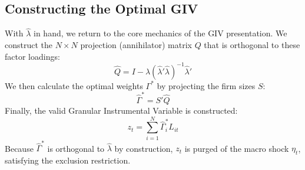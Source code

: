 \documentclass[11pt]{article}
\begin{document}
\subsection{Constructing the Optimal GIV}
With $\hat{\lambda}$ in hand, we return to the core mechanics of the GIV presentation. We construct the $N \times N$ projection (annihilator) matrix $Q$ that is orthogonal to these factor loadings:
\begin{equation}
    \hat{Q} = I - \hat{\lambda}(\hat{\lambda}'\hat{\lambda})^{-1}\hat{\lambda}'
\end{equation}
We then calculate the optimal weights $\Gamma^*$ by projecting the firm sizes $S$:
\begin{equation}
    \hat{\Gamma}^* = S'\hat{Q}
\end{equation}
Finally, the valid Granular Instrumental Variable is constructed:
\begin{equation}
    z_t = \sum_{i=1}^N \hat{\Gamma}^*_i L_{it}
\end{equation}
Because $\hat{\Gamma}^*$ is orthogonal to $\hat{\lambda}$ by construction, $z_t$ is purged of the macro shock $\eta_t$, satisfying the exclusion restriction.
\end{document}
